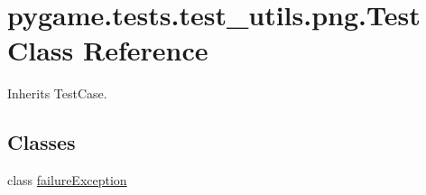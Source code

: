 \hypertarget{classpygame_1_1tests_1_1test__utils_1_1png_1_1_test}{}\section{pygame.\+tests.\+test\+\_\+utils.\+png.\+Test Class Reference}
\label{classpygame_1_1tests_1_1test__utils_1_1png_1_1_test}


Inherits Test\+Case.

\subsection*{Classes}
\begin{DoxyCompactItemize}
\item 
class \hyperlink{classpygame_1_1tests_1_1test__utils_1_1png_1_1_test_1_1failure_exception}{failure\+Exception}
\end{DoxyCompactItemize}
